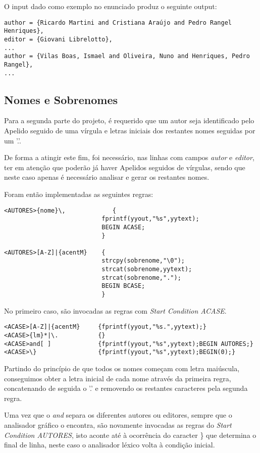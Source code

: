 O input dado como exemplo no enunciado produz o seguinte output:

\begin{verbatim}
author = {Ricardo Martini and Cristiana Araújo and Pedro Rangel Henriques},
editor = {Giovani Librelotto},
...
author = {Vilas Boas, Ismael and Oliveira, Nuno and Henriques, Pedro Rangel},
...
\end{verbatim}

\newpage
\subsection{Nomes e Sobrenomes}
Para a segunda parte do projeto, é requerido que um autor seja identificado pelo Apelido seguido de uma vírgula e letras iniciais dos restantes nomes seguidas por um '.'.

De forma a atingir este fim, foi necessário, nas linhas com campos \emph{autor} e \emph{editor}, ter em atenção que poderão já haver Apelidos seguidos de vírgulas, sendo que neste caso apenas é necessário analisar e gerar os restantes nomes. 

Foram então implementadas as seguintes regras:
\begin{verbatim}
<AUTORES>{nome}\,	          {
                           fprintf(yyout,"%s",yytext);
                           BEGIN ACASE;
                           }
                           
<AUTORES>[A-Z]|{acentM}    {
                           strcpy(sobrenome,"\0");
                           strcat(sobrenome,yytext);
                           strcat(sobrenome,".");
                           BEGIN BCASE;
                           }
\end{verbatim}

No primeiro caso, são invocadas as regras com \emph{Start Condition ACASE}.
\begin{verbatim}
<ACASE>[A-Z]|{acentM}     {fprintf(yyout,"%s.",yytext);}
<ACASE>{lm}*|\.           {}
<ACASE>and[ ]             {fprintf(yyout,"%s",yytext);BEGIN AUTORES;}
<ACASE>\}                 {fprintf(yyout,"%s",yytext);BEGIN(0);}
\end{verbatim}

Partindo do princípio de que todos os nomes começam com letra maiúscula, conseguimos obter a letra inicial de cada nome através da primeira regra, concatenando de seguida o '.' e removendo os restantes caracteres pela segunda regra.

Uma vez que o \emph{and} separa os diferentes autores ou editores, sempre que o analisador gráfico o encontra, são novamente invocadas as regras do \emph{Start Condition AUTORES}, isto aconte até à ocorrência do caracter \} que determina o final de linha, neste caso o analisador léxico volta à condição inicial.

